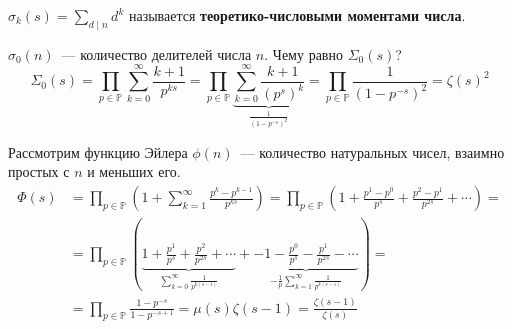 \documentclass{article}
\begin{document}
    \begin{definition}
        $\sigma_k(s)=\sum\limits_{d\mathrel|n}d^k$ называется \textbf{теоретико-числовыми моментами числа}.
    \end{definition}
    \begin{example}
        $\sigma_0(n)$~--- количество делителей числа $n$. Чему равно $\Sigma_0(s)$?
        $$
        \Sigma_0(s)=\prod\limits_{p\in\mathbb P}\sum\limits_{k=0}^\infty\frac{k+1}{p^{ks}}=
        \prod\limits_{p\in\mathbb P}\underbrace{\sum\limits_{k=0}^\infty\frac{k+1}{(p^s)^k}}_{\frac1{(1-p^{-s})^2}}=
        \prod\limits_{p\in\mathbb P}\frac1{(1-p^{-s})^2}=\zeta(s)^2
        $$
    \end{example}
    \begin{example}
        Рассмотрим функцию Эйлера $\phi(n)$~--- количество натуральных чисел, взаимно простых с $n$ и меньших его.
        \[\begin{split}
            \Phi(s)&=\prod\limits_{p\in\mathbb P}\left(1+\sum\limits_{k=1}^\infty\frac{p^k-p^{k-1}}{p^{ks}}\right)=\prod\limits_{p\in\mathbb P}\left(1+\frac{p^1-p^0}{p^s}+\frac{p^2-p^1}{p^{2s}}+\cdots\right)=\\
            &=\prod\limits_{p\in\mathbb P}\left(\underbrace{1+\frac{p^1}{p^s}+\frac{p^2}{p^{2s}}+\cdots}_{\sum\limits_{k=0}^\infty\frac1{p^{k(s-1)}}}+\underbrace{-1-\frac{p^0}{p^s}-\frac{p^1}{p^{2s}}-\cdots}_{-\frac1p\sum\limits_{k=1}^\infty\frac1{p^{k(s-1)}}}\right)=\\
            &=\prod\limits_{p\in\mathbb P}\frac{1-p^{-s}}{1-p^{-s+1}}=\mu(s)\zeta(s-1)=\frac{\zeta(s-1)}{\zeta(s)}
        \end{split}\]
    \end{example}
\end{document}
